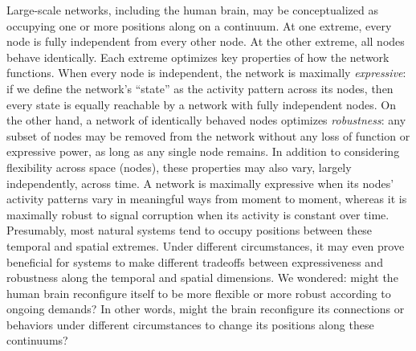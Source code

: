 \documentclass[english, 11pt]{article}
\begin{document}
Large-scale networks, including the human brain, may be conceptualized as
occupying one or more positions along on a continuum. At one extreme, every
node is fully independent from every other node. At the other extreme, all
nodes behave identically. Each extreme optimizes key properties of how the
network functions. When every node is independent, the network is maximally
\textit{expressive}: if we define the network's ``state'' as the activity
pattern across its nodes, then every state is equally reachable by a network
with fully independent nodes. On the other hand, a network of identically
behaved nodes optimizes \textit{robustness}: any subset of nodes may be removed
from the network without any loss of function or expressive power, as long as
any single node remains. In addition to considering flexibility across space
(nodes), these properties may also vary, largely independently, across time. A
network is maximally expressive when its nodes' activity patterns vary in
meaningful ways from moment to moment, whereas it is maximally robust to signal
corruption when its activity is constant over time. Presumably, most natural
systems tend to occupy positions between these temporal and spatial extremes. Under
different circumstances, it may even prove beneficial for systems to make
different tradeoffs between expressiveness and robustness along the temporal
and spatial dimensions.  We wondered: might the human brain reconfigure itself to
be more flexible or more robust according to ongoing demands? In other words,
might the brain reconfigure its connections or behaviors under different
circumstances to change its positions along these continuums?
\end{document}
